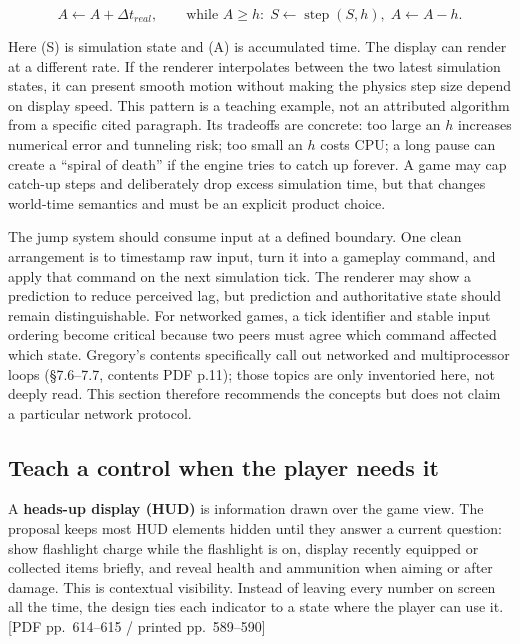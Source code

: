 \[
A \leftarrow A + \Delta t_{real}, \qquad
\text{while } A \ge h: \; S \leftarrow \operatorname{step}(S,h),\; A \leftarrow A-h.
\]

Here (S) is simulation state and (A) is accumulated time. The display can render at a different rate. If the renderer interpolates between the two latest simulation states, it can present smooth motion without making the physics step size depend on display speed. This pattern is a teaching example, not an attributed algorithm from a specific cited paragraph. Its tradeoffs are concrete: too large an \(h\) increases numerical error and tunneling risk; too small an \(h\) costs CPU; a long pause can create a ``spiral of death'' if the engine tries to catch up forever. A game may cap catch-up steps and deliberately drop excess simulation time, but that changes world-time semantics and must be an explicit product choice.

The jump system should consume input at a defined boundary. One clean arrangement is to timestamp raw input, turn it into a gameplay command, and apply that command on the next simulation tick. The renderer may show a prediction to reduce perceived lag, but prediction and authoritative state should remain distinguishable. For networked games, a tick identifier and stable input ordering become critical because two peers must agree which command affected which state. Gregory's contents specifically call out networked and multiprocessor loops (§7.6--7.7, contents PDF p.11); those topics are only inventoried here, not deeply read. This section therefore recommends the concepts but does not claim a particular network protocol.

\subsection{Teach a control when the player needs it}\label{05-engine-i-ch014-teach-a-control-when-the-player-needs-it}

A \textbf{heads-up display (HUD)} is information drawn over the game view. The proposal keeps most HUD elements hidden until they answer a current question: show flashlight charge while the flashlight is on, display recently equipped or collected items briefly, and reveal health and ammunition when aiming or after damage. This is contextual visibility. Instead of leaving every number on screen all the time, the design ties each indicator to a state where the player can use it. {[}PDF pp.~614--615 / printed pp.~589--590{]}

